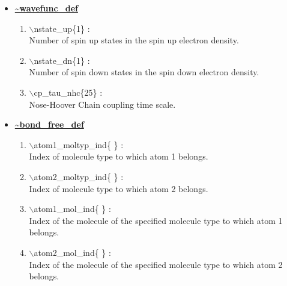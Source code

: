 \documentclass[12pt]{article}
\begin{document}
\begin{itemize}
\begin{enumerate}
\end{enumerate}

\clearpage
\huge
\item[] \underline{\bf \~{}wavefunc\_def}
\begin{enumerate}


 \vspace{0.15in} \Large
 \item  $\backslash$nstate\_up\{1\} : \\ 
    \large
     Number of spin up states in the spin up electron density.

 \vspace{0.15in} \Large
 \item  $\backslash$nstate\_dn\{1\} : \\
    \large
     Number of spin down states in the spin down electron density.

 \vspace{0.15in} \Large
 \item  $\backslash$cp\_tau\_nhc\{25\} : \\
    \large
     Nose-Hoover Chain coupling time scale.

\end{enumerate}

\clearpage
\huge
\item[] \underline{\bf \~{}bond\_free\_def}
\begin{enumerate}

 \vspace{0.15in} \Large
 \item  $\backslash$atom1\_moltyp\_ind\{ \} : \\ 
    \large
    Index of molecule type to which atom 1 belongs.

 \vspace{0.15in} \Large
 \item  $\backslash$atom2\_moltyp\_ind\{ \} : \\ 
    \large
    Index of molecule type to which atom 2 belongs.

 \vspace{0.15in} \Large
 \item  $\backslash$atom1\_mol\_ind\{ \} : \\    
    \large
    Index of the molecule of the specified molecule type 
    to which atom 1 belongs.

 \vspace{0.15in} \Large
 \item  $\backslash$atom2\_mol\_ind\{ \} : \\    
    \large
    Index of the molecule of the specified molecule type 
    to which atom 2 belongs.


\end{enumerate}
\end{itemize}
\end{document}
